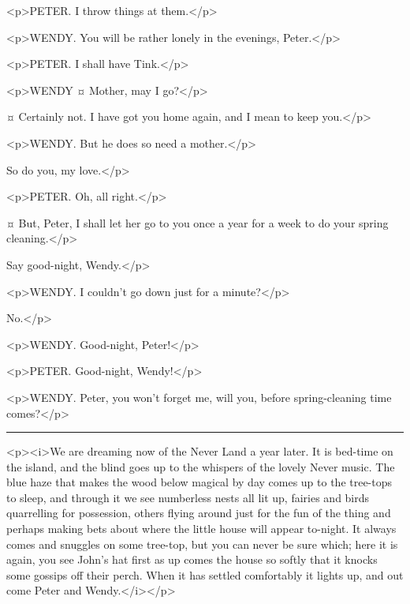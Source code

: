 \begin{drama}
<p>PETER. I throw things at them.</p>

<p>WENDY. You will be rather lonely in the evenings, Peter.</p>

<p>PETER. I shall have Tink.</p>

<p>WENDY ¤
Mother, may I go?</p>

\mrsdarlingspeaks {}¤
Certainly not. I have got you home again, and I mean to keep you.</p>

<p>WENDY. But he does so need a mother.</p>

\mrsdarlingspeaks
So do you, my love.</p>

<p>PETER. Oh, all right.</p>

\mrsdarlingspeaks {}¤
But, Peter, I shall let her go to you once a year for a week to do your spring cleaning.</p>


\mrsdarlingspeaks
Say good-night, Wendy.</p>

<p>WENDY. I couldn't go down just for a minute?</p>

\mrsdarlingspeaks
No.</p>

<p>WENDY. Good-night, Peter!</p>

<p>PETER. Good-night, Wendy!</p>

<p>WENDY. Peter, you won't forget me, will you, before spring-cleaning time comes?</p>


\plainbreak{1}

<p><i>We are dreaming now of the Never Land a year later. It is bed-time on the island, and the blind goes up to the whispers of the lovely Never music. The blue haze that makes the wood below magical by day comes up to the tree-tops to sleep, and through it we see numberless nests all lit up, fairies and birds quarrelling for possession, others flying around just for the fun of the thing and perhaps making bets about where the little house will appear to-night. It always comes and snuggles on some tree-top, but you can never be sure which; here it is again, you see John's hat first as up comes the house so softly that it knocks some gossips off their perch. When it has settled comfortably it lights up, and out come Peter and Wendy.</i></p>


\end{drama}
